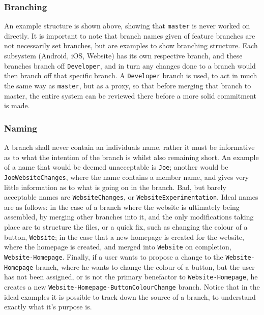 \documentclass[12pt]{article}
\begin{document}
\flushleft\subsubsection{Branching}
  An example structure is shown above, showing that \texttt{master} is never worked on directly. It is important to note that branch names given of feature branches are not necessarily set branches, but are examples to show branching structure. Each subsystem (Android, iOS, Website) has its own respective branch, and these branches branch off \texttt{Developer}, and in turn any changes done to a branch would then branch off that specific branch. 
  A \texttt{Developer} branch is used, to act in much the same way as \texttt{master}, but as a proxy, so that before merging that branch to master, the entire system can be reviewed there before a more solid commitment is made.
  \subsubsection{Naming}
  \flushleft
  A branch shall never contain an individuals name, rather it must be informative as to what the intention of the branch is whilst also remaining short. An example of a  name that would be deemed unacceptable is \texttt{Joe}; another would be \texttt{JoeWebsiteChanges}, where the name contains a member name, and gives very little information as to what is going on in the branch. Bad, but barely acceptable names are \texttt{WebsiteChanges}, or \texttt{WebsiteExperimentation}. Ideal names are as follows: in the case of a branch where the website is ultimately being assembled, by merging other branches into it, and the only modifications taking place are to structure the files, or a quick fix, such as changing the colour of a button, \texttt{Website}; in the case that a new homepage is created for the website, where the homepage is created, and merged into \texttt{Website} on completion, \texttt{Website-Homepage}. Finally, if a user wants to propose a change to the \texttt{Website-Homepage} branch, where he wants to change the colour of a button, but the user has not been assigned, or is not the primary benefactor to \texttt{Website-Homepage}, he creates a new \texttt{Website-Homepage-ButtonColourChange} branch. Notice that in the ideal examples it is possible to track down the source of a branch, to understand exactly what it's purpose is.
  
\end{document}
